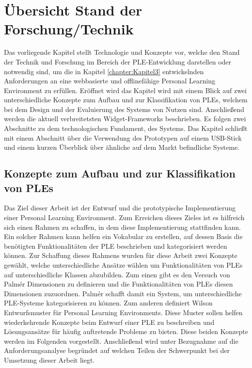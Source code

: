 \chapter{Übersicht Stand der Forschung/Technik} 
\label{chapter:Kapitel4}

Das vorliegende Kapitel stellt Technologie und Konzepte vor, welche den Stand der Technik und Forschung im Bereich der PLE-Entwicklung darstellen oder notwendig sind, um die in Kapitel \ref{chapter:Kapitel3} entwickelnden Anforderungen an eine webbasierte und offlinefähige Personal Learning Environment zu erfüllen. Eröffnet wird das Kapitel wird mit einem Blick auf zwei unterschiedliche Konzepte zum Aufbau und zur Klassifikation von PLEs, welchem bei dem Design und der Evaluierung des Systems von Nutzen sind. Anschließend werden die aktuell verbreitetsten Widget-Frameworks beschrieben. Es folgen zwei Abschnitte zu dem technologischen Fundament, des Systems. Das Kapitel schließt mit einem Abschnitt über die Verwendung des Prototypen auf einem USB-Stick und einem kurzen Überblick über ähnliche auf dem Markt befindliche Systeme. 

\section{Konzepte zum Aufbau und zur Klassifikation von PLEs}
Das Ziel dieser Arbeit ist der Entwurf und die prototypische Implementierung einer Personal Learning Environment. Zum Erreichen dieses Zieles ist es hilfreich sich einen Rahmen zu schaffen, in dem diese Implementierung stattfinden kann. Ein solcher Rahmen kann helfen ein Vokabular zu erstellen, auf dessen Basis die benötigten Funktionalitäten der PLE  beschrieben und kategorisiert werden können. Zur Schaffung dieses Rahmens wurden für diese Arbeit zwei Konzepte gewählt, welche unterschiedliche Ansätze wählen um Funktionalitäten von PLEs auf unterschiedliche Klassen abzubilden. Zum einen gibt es den Versuch von Palmér Dimensionen zu definieren und die Funktionalitäten von PLEs diesen Dimensionen zuzuordnen. Palmér schafft damit ein System, um unterschiedliche PLE-Systeme kategorisieren zu können. Zum anderen definiert Wilson Entwurfsmuster für Personal Learning Environments. Diese Muster sollen helfen wiederkehrende Konzepte beim Entwurf einer PLE zu beschreiben und Lösungsansätze für häufig auftretende Probleme zu bieten. Diese beiden Konzepte werden im Folgenden vorgestellt. Anschließend wird unter Bezugnahme auf die Anforderungsanalyse begründet auf welchen Teilen der Schwerpunkt bei der Umsetzung dieser Arbeit liegt.

